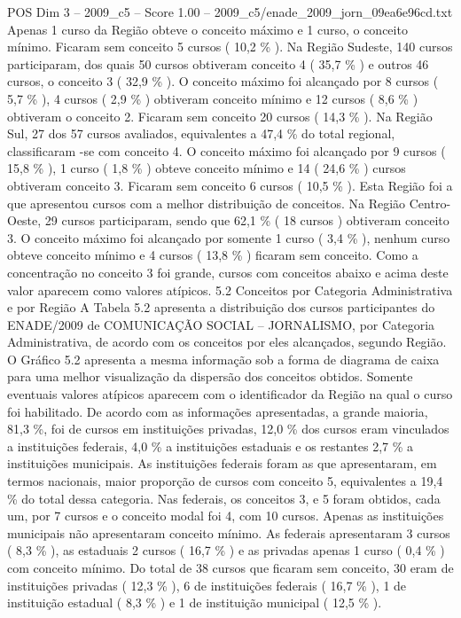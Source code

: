 \begin{textsample}{POS Dim 3 – 2009\_c5 – Score 1.00 – 2009\_c5/enade\_2009\_jorn\_09ea6e96cd.txt}
Apenas 1 curso da Região obteve o conceito máximo e 1 curso, o conceito mínimo.
Ficaram sem conceito 5 cursos ( 10,2 \% ).
Na Região Sudeste, 140 cursos participaram, dos quais 50 cursos obtiveram conceito 4 ( 35,7 \% ) e outros 46 cursos, o conceito 3 ( 32,9 \% ).
O conceito máximo foi alcançado por 8 cursos ( 5,7 \% ), 4 cursos ( 2,9 \% ) obtiveram conceito mínimo e 12 cursos ( 8,6 \% ) obtiveram o conceito 2.
Ficaram sem conceito 20 cursos ( 14,3 \% ).
Na Região Sul, 27 dos 57 cursos avaliados, equivalentes a 47,4 \% do total regional, classificaram -se com conceito 4.
O conceito máximo foi alcançado por 9 cursos ( 15,8 \% ), 1 curso ( 1,8 \% ) obteve conceito mínimo e 14 ( 24,6 \% ) cursos obtiveram conceito 3.
Ficaram sem conceito 6 cursos ( 10,5 \% ).
Esta Região foi a que apresentou cursos com a melhor distribuição de conceitos.
Na Região Centro-Oeste, 29 cursos participaram, sendo que 62,1 \% ( 18 cursos ) obtiveram conceito 3.
O conceito máximo foi alcançado por somente 1 curso ( 3,4 \% ), nenhum curso obteve conceito mínimo e 4 cursos ( 13,8 \% ) ficaram sem conceito.
Como a concentração no conceito 3 foi grande, cursos com conceitos abaixo e acima deste valor aparecem como valores atípicos. 5.2 Conceitos por Categoria Administrativa e por Região A Tabela 5.2 apresenta a distribuição dos cursos participantes do ENADE/2009 de COMUNICAÇÃO SOCIAL – JORNALISMO, por Categoria Administrativa, de acordo com os conceitos por eles alcançados, segundo Região.
O Gráfico 5.2 apresenta a mesma informação sob a forma de diagrama de caixa para uma melhor visualização da dispersão dos conceitos obtidos.
Somente eventuais valores atípicos aparecem com o identificador da Região na qual o curso foi habilitado.
De acordo com as informações apresentadas, a grande maioria, 81,3 \%, foi de cursos em instituições privadas, 12,0 \% dos cursos eram vinculados a instituições federais, 4,0 \% a instituições estaduais e os restantes 2,7 \% a instituições municipais.
As instituições federais foram as que apresentaram, em termos nacionais, maior proporção de cursos com conceito 5, equivalentes a 19,4 \% do total dessa categoria.
Nas federais, os conceitos 3, e 5 foram obtidos, cada um, por 7 cursos e o conceito modal foi 4, com 10 cursos.
Apenas as instituições municipais não apresentaram conceito mínimo.
As federais apresentaram 3 cursos ( 8,3 \% ), as estaduais 2 cursos ( 16,7 \% ) e as privadas apenas 1 curso ( 0,4 \% ) com conceito mínimo.
Do total de 38 cursos que ficaram sem conceito, 30 eram de instituições privadas ( 12,3 \% ), 6 de instituições federais ( 16,7 \% ), 1 de instituição estadual ( 8,3 \% ) e 1 de instituição municipal ( 12,5 \% ).

\end{textsample}
